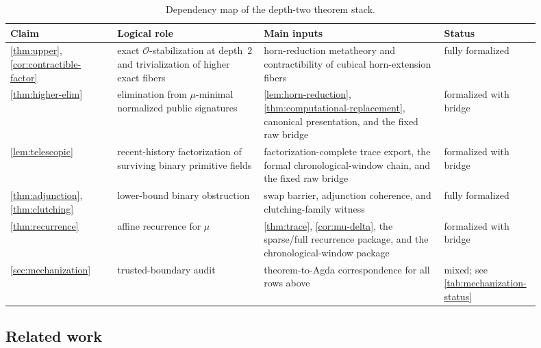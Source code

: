 \documentclass{lmcs}
\newcommand{\Ocal}{\mathcal{O}}
\begin{document}
\begin{table}[t]
\centering
\caption{Dependency map of the depth-two theorem stack.}
\label{tab:claim-map}
\small
\begin{tabular}{@{}p{0.19\linewidth}p{0.26\linewidth}p{0.32\linewidth}p{0.13\linewidth}@{}}
\toprule
Claim & Logical role & Main inputs & Status \\
\midrule
\autoref{thm:upper}, \autoref{cor:contractible-factor} & exact $\Ocal$-stabilization at depth~$2$ and trivialization of higher exact fibers & horn-reduction metatheory and contractibility of cubical horn-extension fibers & fully formalized \\
\autoref{thm:higher-elim} & elimination from $\mu$-minimal normalized public signatures & \autoref{lem:horn-reduction}, \autoref{thm:computational-replacement}, canonical presentation, and the fixed raw bridge & formalized with bridge \\
\autoref{lem:telescopic} & recent-history factorization of surviving binary primitive fields & factorization-complete trace export, the formal chronological-window chain, and the fixed raw bridge & formalized with bridge \\
\autoref{thm:adjunction}, \autoref{thm:clutching} & lower-bound binary obstruction & swap barrier, adjunction coherence, and clutching-family witness & fully formalized \\
\autoref{thm:recurrence} & affine recurrence for $\mu$ & \autoref{thm:trace}, \autoref{cor:mu-delta}, the sparse/full recurrence package, and the chronological-window package & formalized with bridge \\
\autoref{sec:mechanization} & trusted-boundary audit & theorem-to-Agda correspondence for all rows above & mixed; see \autoref{tab:mechanization-status} \\
\bottomrule
\end{tabular}
\end{table}

\subsection{Related work}
\label{sec:related}
\end{document}

